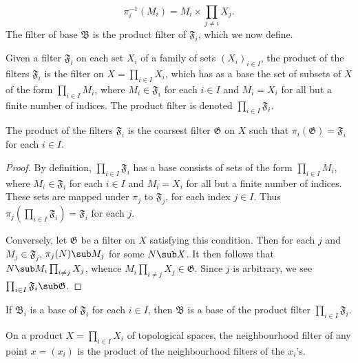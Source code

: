\[\pi_i^{-1}(M_i)=M_i\times\prod_{j\neq i}X_j.\]
The filter of base $\mathfrak{B}$ is the product filter of $\mathfrak{F}_i$, which we now define.
\begin{definition}
Given a filter $\mathfrak{F}_i$ on each set $X_i$ of a family of sets $(X_i)_{i\in I}$, the product of the filters $\mathfrak{F}_i$ is the filter on $X=\prod_{i\in I}X_i$, which has as a base the set of subsets of $X$ of the form $\prod_{i\in I}M_i$, where $M_i\in\mathfrak{F}_i$ for each $i\in I$ and $M_i=X_i$ for all but a finite number of indices. The product filter is denoted $\prod_{i\in I}\mathfrak{F}_i$.
\end{definition}
\begin{proposition}
The product of the filters $\mathfrak{F}_i$ is the coarsest filter $\mathfrak{G}$ on $X$ such that $\pi_i(\mathfrak{G})=\mathfrak{F}_i$ for each $i\in I$.
\end{proposition}
\begin{proof}
By definition, $\prod_{i\in I}\mathfrak{F}_i$ has a base consists of sets of the form $\prod_{i\in I}M_i$, where $M_i\in\mathfrak{F}_i$ for each $i\in I$ and $M_i=X_i$ for all but a finite number of indices. These sets are mapped under $\pi_j$ to $\mathfrak{F}_j$, for each index $j\in I$. Thus $\pi_j(\prod_{i\in I}\mathfrak{F}_i)=\mathfrak{F}_i$ for each $j$.\par
Conversely, let $\mathfrak{G}$ be a filter on $X$ satisfying this condition. Then for each $j$ and $M_j\in\mathfrak{F}_j$, $\pi_j(N)\sub M_j$ for some $N\sub X$. It then follows that $N\sub M_i\prod_{i\neq j}X_j$, whence $M_i\prod_{i\neq j}X_j\in\mathfrak{G}$. Since $j$ is arbitrary, we see $\prod_{i\in I}\mathfrak{F}_i\sub\mathfrak{G}$.
\end{proof}
\begin{corollary}
If $\mathfrak{B}_i$ is a base of $\mathfrak{F}_i$ for each $i\in I$, then $\mathfrak{B}$ is a base of the product filter $\prod_{i\in I}\mathfrak{F}_i$.
\end{corollary}
\begin{example}
On a product $X=\prod_{i\in I}X_i$ of topological spaces, the neighbourhood filter of any point $x=(x_i)$ is the product of the neighbourhood filters of the $x_i$'s.
\end{example}

